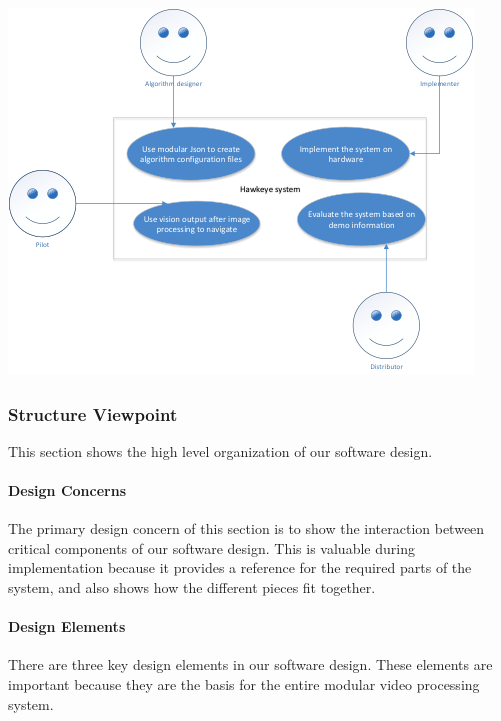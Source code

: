 	\begin{minipage}{\linewidth}
		\includegraphics[keepaspectratio=true,scale=0.6]{images/UseCase_Diagram.png}
		
	\end{minipage}
	
\subsubsection{Structure Viewpoint}
This section shows the high level organization of our software design.  
	\paragraph{Design Concerns}
	The primary design concern of this section is to show the interaction between critical components of our software design. This is valuable during implementation because it provides a reference for the required parts of the system, and also shows how the different pieces fit together.\\
	\paragraph{Design Elements}
	There are three key design elements in our software design. These elements are important because they are the basis for the entire modular video processing system.\\
	
